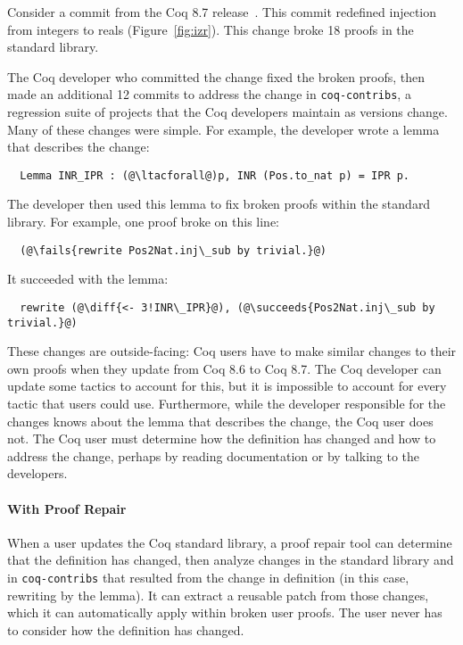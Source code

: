 Consider a commit from the Coq 8.7 release~\cite{coq87commit}. 
This commit redefined injection from integers to reals (Figure~\ref{fig:izr}).
This change broke 18 proofs in the standard library. 

The Coq developer who committed the change fixed the broken proofs, then
made an additional 12 commits to address the change in \lstinline{coq-contribs},
a regression suite of projects that the Coq developers maintain as versions change.
Many of these changes were simple. For example, the developer wrote a lemma that describes the change:

\lstset{language=coq, aboveskip=3pt, belowskip=3pt}
\begin{lstlisting}
  Lemma INR_IPR : (@\ltacforall@)p, INR (Pos.to_nat p) = IPR p.
\end{lstlisting}
The developer then used this lemma to fix broken proofs within the standard library. 
For example, one proof broke on this line:

\begin{lstlisting}
  (@\fails{rewrite Pos2Nat.inj\_sub by trivial.}@)
\end{lstlisting}
It succeeded with the lemma:

\begin{lstlisting}
  rewrite (@\diff{<- 3!INR\_IPR}@), (@\succeeds{Pos2Nat.inj\_sub by trivial.}@)
\end{lstlisting}

These changes are outside-facing: Coq users have to make similar changes to their own proofs when
they update from Coq 8.6 to Coq 8.7. The Coq developer can update some tactics to account for this, but it is 
impossible to account for every tactic that users could use.
Furthermore, while the developer responsible for the changes knows about
the lemma that describes the change, the Coq user does not. The Coq user must determine
how the definition has changed and how to address the change, perhaps by reading documentation or by
talking to the developers. 

\paragraph{With Proof Repair} When a user updates the Coq standard library, a proof repair tool can determine
that the definition has changed, then analyze changes in the standard library and in \lstinline{coq-contribs}
that resulted from the change in definition (in this case, rewriting by the lemma).
It can extract a reusable patch from those changes, which it can automatically apply within broken user proofs.
The user never has to consider how the definition has changed.

